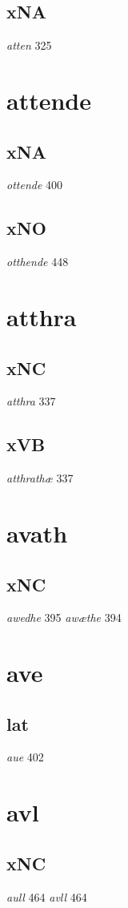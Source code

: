 \documentclass[a4paper,twocolumn]{article}
\begin{document}
\subsection{xNA}
\label{sec:org0f54d71}
\emph{atten} 325 
\section{attende}
\label{sec:org16f9411}
\subsection{xNA}
\label{sec:org14d2a78}
\emph{ottende} 400 
\subsection{xNO}
\label{sec:orgb32560b}
\emph{otthende} 448 
\section{atthra}
\label{sec:org2962687}
\subsection{xNC}
\label{sec:orgb843168}
\emph{atthra} 337 
\subsection{xVB}
\label{sec:org7d62ef8}
\emph{atthrathæ} 337 
\section{avath}
\label{sec:orgf834b84}
\subsection{xNC}
\label{sec:orgd32f7ba}
\emph{awedhe} 395 \emph{awæthe} 394 
\section{ave}
\label{sec:org0a6bcfa}
\subsection{lat}
\label{sec:org18e7af8}
\emph{aue} 402 
\section{avl}
\label{sec:org7b54efe}
\subsection{xNC}
\label{sec:org00ce638}
\emph{aull} 464 \emph{avll} 464 
\end{document}
